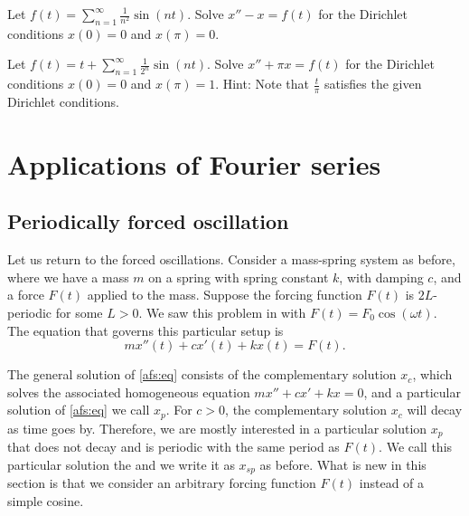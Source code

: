 \begin{exercise}
Let $f(t) = \sum_{n=1}^\infty \frac{1}{n^2} \sin(nt)$.  Solve
$x''- x = f(t)$ for the Dirichlet conditions $x(0) = 0$
and $x(\pi) = 0$.
\end{exercise}

\begin{exercise}[challenging]
Let $f(t) = t + \sum_{n=1}^\infty \frac{1}{2^n} \sin(nt)$.  Solve
$x'' + \pi x = f(t)$ for the Dirichlet conditions $x(0) = 0$
and $x(\pi) = 1$.  Hint:  Note that $\frac{t}{\pi}$ satisfies the
given Dirichlet conditions.
\end{exercise}



\sectionnewpage
\section{Applications of Fourier series}
\label{appoffourier:section}


\subsection{Periodically forced oscillation}

\begin{mywrapfigsimp}{2.0in}{2.3in}
\noindent
{}
\end{mywrapfigsimp}
Let us return to the forced oscillations.  Consider a mass-spring system as
before, where we have a mass $m$
on a spring with spring constant $k$,
with damping $c$, and a force $F(t)$ applied to the mass.  Suppose 
the forcing function $F(t)$ is $2L$-periodic for some $L > 0$.
We saw
this problem in  with $F(t) = F_0 \cos (\omega t)$.  The
equation that governs this particular setup is
\begin{equation} \label{afs:eq}
mx''(t) + cx'(t) + kx(t) = F(t) .
\end{equation}

The general solution of \eqref{afs:eq} consists of the complementary solution $x_c$, which
solves the associated homogeneous equation $mx'' + cx' + kx = 0$, and
a particular solution of \eqref{afs:eq} we call $x_p$.  For $c > 0$,
the complementary solution $x_c$ will decay as time goes by.
Therefore,
we are mostly interested
in a particular solution $x_p$ that does not decay
and is periodic with the same period as $F(t)$.  We call this particular
solution
the \emph{} and we write it as $x_{sp}$ as before.
What is new in this section is that we consider an arbitrary
forcing function $F(t)$ instead of a simple cosine.

